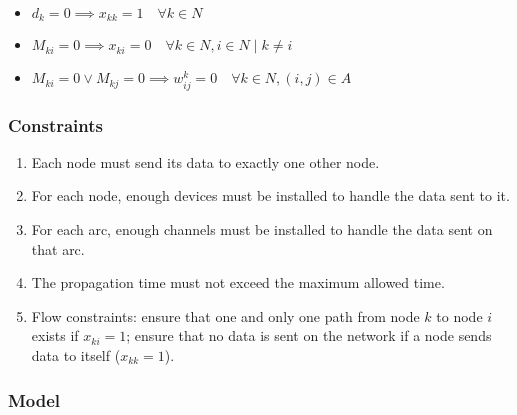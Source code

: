\begin{itemize}
	\item $d_k = 0 \implies x_{kk} = 1 \quad \forall k \in N$
	\item $M_{ki} = 0 \implies x_{ki} = 0 \quad \forall k \in N, i \in N \mid k \ne i$
	\item $M_{ki} = 0 \vee M_{kj} = 0 \implies w_{ij}^k = 0 \quad \forall k \in N, (i, j) \in A$
\end{itemize}

\subsubsection*{Constraints}

\begin{enumerate}
	\item Each node must send its data to exactly one other node.
	\item For each node, enough devices must be installed to handle the data sent to it.
	\item For each arc, enough channels must be installed to handle the data sent on that arc.
	\item The propagation time must not exceed the maximum allowed time.
	\item Flow constraints: ensure that one and only one path from node $k$ to node $i$ exists if $x_{ki} = 1$; ensure that no data is sent on the network if a node sends data to itself ($x_{kk} = 1$).
\end{enumerate}

\subsubsection*{Model}


